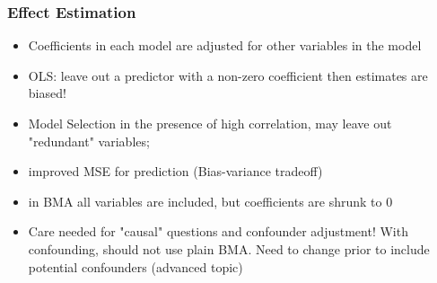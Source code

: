 \documentclass[]{beamer}\usepackage[]{graphicx}\usepackage[]{color}
\begin{document}
\begin{frame}
  \frametitle{Effect Estimation}
  \begin{itemize}
  \item  Coefficients in each model are adjusted for other variables
    in the model
\item OLS:  leave out a predictor with a non-zero coefficient then
  estimates are biased!
\item Model Selection in the presence of high correlation, may leave
  out "redundant" variables;
\item improved MSE for prediction (Bias-variance tradeoff)

\item in BMA all variables are included, but coefficients are
   shrunk to 0
\item Care needed for "causal" questions   and confounder adjustment!    With confounding, should not use plain BMA.  Need to change prior to
  include potential confounders  (advanced topic)

  \end{itemize}


\end{frame}
\end{document}

